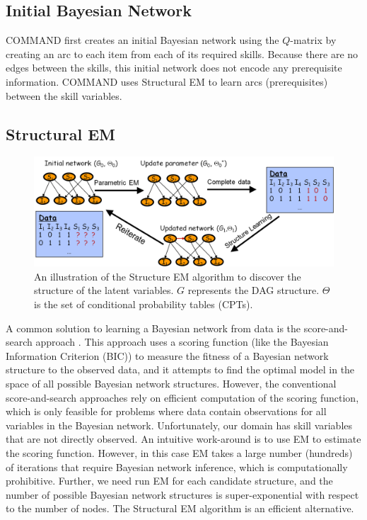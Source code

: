 \documentclass{edm_template}
\begin{document}
\subsection{Initial Bayesian Network}
\label{sec:initial_bn}
COMMAND first creates an initial Bayesian network using the  $Q$-matrix
by creating an arc to each item from each of its required skills.
Because there are no edges between the skills, this  initial network does not encode any prerequisite information.
COMMAND uses Structural EM to learn arcs  (prerequisites) between the skill variables.

\subsection{Structural EM}
\label{sec:sem}

\begin{figure}%
	\begin{center}
		\includegraphics[width=1.0\linewidth]{figures/sem.png}
	\end{center}
	\caption{\small An illustration of the Structure EM algorithm to discover the structure of the latent variables. $G$ represents the DAG structure. $\Theta$ is the set of conditional probability tables (CPTs).}
	\label{fig:sem}
	\vspace{-1em} 
\end{figure} 

A common solution to learning a Bayesian network from data is the score-and-search approach \cite{cooper1992bayesian,heckerman1997bayesian}.
This approach uses a scoring function (like  the Bayesian Information Criterion (BIC)) to measure the fitness of a Bayesian network structure to the observed data, 
and it attempts to find the optimal model in the space of all possible Bayesian network structures.
However, the conventional score-and-search approaches rely on efficient computation of the scoring function, 
which is only feasible for problems where data contain observations for all variables in the Bayesian network.
Unfortunately, our domain has skill variables that are not directly observed.
An intuitive work-around is to use EM  to estimate the scoring function.
However, in this case EM takes a large number (hundreds) of iterations that require Bayesian network inference, which is computationally prohibitive.
Further, we need run EM for each candidate structure, and the number of possible Bayesian network structures is super-exponential with respect to the number of nodes.
The Structural EM algorithm \cite{friedman1997learning} is an efficient alternative.
\end{document}
